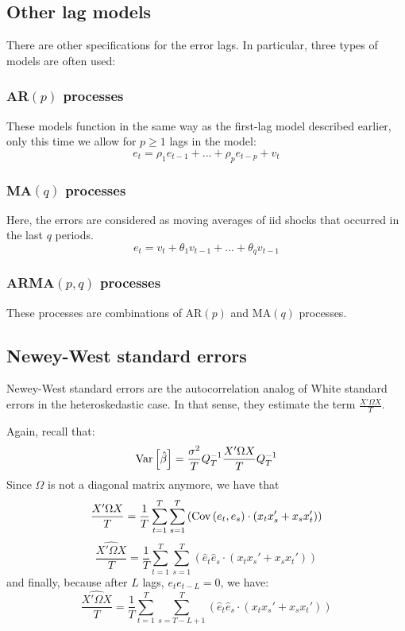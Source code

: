 \subsection{Other lag models}

There are other specifications for the error lags. In particular, three types of models are often used:

\subsubsection{AR$(p)$ processes}

These models function in the same way as the first-lag model described earlier, only this time we allow for $p\geq 1$ lags in the model: $$e_t = \rho_1 e_{t-1} + ... + \rho_p e_{t-p} + v_t $$

\subsubsection{MA$(q)$ processes}

Here, the errors are considered as moving averages of iid shocks that occurred in the last $q$ periods. $$e_t = v_t + \theta_1 v_{t-1} + ... + \theta_q v_{t-1} $$

\subsubsection{ARMA$(p,q)$ processes}

These processes are combinations of AR$(p)$ and MA$(q)$ processes.

\subsection{Newey-West standard errors}

Newey-West standard errors are the autocorrelation analog of White standard errors in the heteroskedastic case. In that sense, they estimate the term $\frac{X'\Omega X}{T}$.

Again, recall that: $$\operatorname{Var}\left[\hat \beta\right] = \frac{\sigma^2}{T}Q_T^{-1} \frac{X'\Omega X}{T} Q_T^{-1} $$ Since $\Omega$ is not a diagonal matrix anymore, we have that $$\frac{X'\Omega X}{T} = \frac{1}{T}\sum_{t=1}^{T}\sum_{s=1}^{T}\left( \operatorname{Cov}\left(e_t,e_s\right)\cdot(x_tx_s' + x_sx_t') \right) $$ $$\widehat{\frac{X'\Omega X}{T}} = \frac{1}{T}\sum_{t=1}^{T}\sum_{s=1}^{T}\left(\hat e_t\hat e_s\cdot(x_tx_s' + x_sx_t') \right) $$ and finally, because after $L$ lags, $e_te_{t-L} = 0$, we have: $$\widehat{\frac{X'\Omega X}{T}} = \frac{1}{T}\sum_{t=1}^{T}\sum_{s=T-L+1}^{T}\left(\hat e_t\hat e_s\cdot(x_tx_s' + x_sx_t') \right) $$